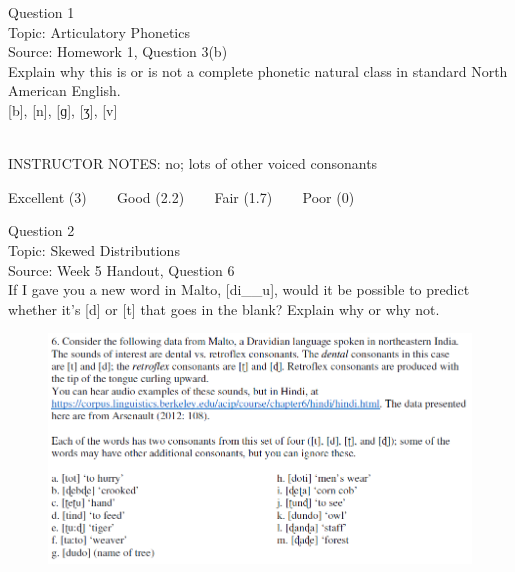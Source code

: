 \documentclass[12pt]{article}
\begin{document}
\begin{center}
\textbf{{\color{violet}{\HUGE 20201117 Tuesday\\}}}

\textbf{{\color{violet}{\HUGE ALL EXAMS (with notes)\\}}}

\end{center}
\newpage

\begin{center}
\textbf{{\color{blue}{\HUGE START OF EXAM\\}}}

\textbf{{\color{blue}{\HUGE Student ID: 42792\\}}}

\textbf{{\color{blue}{\HUGE 4:00\\}}}

\end{center}
\newpage

{\large Question 1}\\

Topic: Articulatory Phonetics\\
Source: Homework 1, Question 3(b)\\

Explain why this is or is not a complete phonetic natural class in standard North American English.\\

{[b]}, {[n]}, {[ɡ]}, {[ʒ]}, {[v]}


~\\
INSTRUCTOR NOTES: no; lots of other voiced consonants


\vfill
Excellent (3) ~~~ Good (2.2) ~~~ Fair (1.7) ~~~ Poor (0)
\newpage

{\large Question 2}\\

Topic: Skewed Distributions\\
Source: Week 5 Handout, Question 6\\

If I gave you a new word in Malto, [di\_\_u], would it be possible to predict whether it's [d] or [t] that goes in the blank? Explain why or why not.\\

\begin{figure}[H]
\includegraphics{../images/malto.png}
\end{figure}
\end{document}
